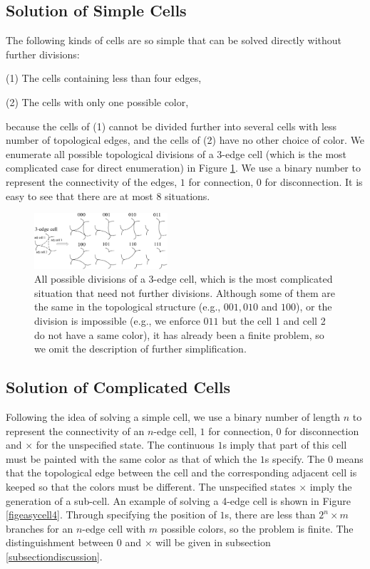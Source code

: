 \documentclass[journal]{IEEEtran}
\begin{document}
\subsection{Solution of Simple Cells}
The following kinds of cells are so simple that can be solved directly without further divisions:

(1) The cells containing less than four edges,

(2) The cells with only one possible color,

\noindent
because the cells of (1) cannot be divided further into several cells with less number of topological edges, and the cells of (2) have no other choice of color. We enumerate all possible topological divisions of a 3-edge cell (which is the most complicated case for direct enumeration) in Figure \ref{figeasycell3}. We use a binary number to represent the connectivity of the edges, $1$ for connection, $0$ for disconnection. It is easy to see that there are at most $8$ situations.

\begin{figure}[t]
\centering
\includegraphics[width = 0.44\textwidth]{easycell/cell3}
\caption{All possible divisions of a 3-edge cell, which is the most complicated situation that need not further divisions. Although some of them are the same in the topological structure (e.g., $001, 010$ and $100$), or the division is impossible (e.g., we enforce $011$ but the cell 1 and cell 2 do not have a same color), it has already been a finite problem, so we omit the description of further simplification. }\label{figeasycell3}
\end{figure}


\subsection{Solution of Complicated Cells}


Following the idea of solving a simple cell, we use a binary number of length $n$ to represent the connectivity of an $n$-edge cell, $1$ for connection, $0$ for disconnection and $\times$ for the unspecified state. 
The continuous $1$s imply that part of this cell must be painted with the same color as that of which the $1$s specify. 
The $0$ means that the topological edge between the cell and the corresponding adjacent cell is keeped so that the colors must be different. 
The unspecified states $\times$ imply the generation of a sub-cell. An example of solving a 4-edge cell is shown in Figure \ref{figeasycell4}. Through specifying the position of $1$s, there are less than $2^n\times m$ branches for an $n$-edge cell with $m$ possible colors, so the problem is finite. The distinguishment between $0$ and $\times$ will be given in subsection \ref{subsectiondiscussion}.
\end{document}
